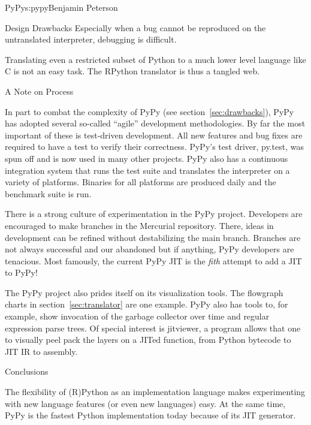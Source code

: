 \begin{aosachapter}{PyPy}{s:pypy}{Benjamin Peterson}
\begin{aosasect1}{Design Drawbacks}
Especially when a bug cannot be reproduced on the untranslated interpreter,
debugging is difficult.

Translating even a restricted subset of Python to a much lower level language
like C is not an easy task. The RPython translator is thus a tangled web.

\end{aosasect1}

\begin{aosasect1}{A Note on Process}

In part to combat the complexity of PyPy (see section~\ref{sec:drawbacks}), PyPy
has adopted several so-called ``agile'' development methodologies. By far the
most important of these is test-driven development. All new features and bug
fixes are required to have a test to verify their correctness. PyPy's test
driver, py.test, was spun off and is now used in many other projects. PyPy also
has a continuous integration system that runs the test suite and translates the
interpreter on a variety of platforms. Binaries for all platforms are produced
daily and the benchmark suite is run.

There is a strong culture of experimentation in the PyPy project. Developers are
encouraged to make branches in the Mercurial repository. There, ideas in
development can be refined without destabilizing the main branch. Branches are
not always successful and our abandoned but if anything, PyPy developers are
tenacious. Most famously, the current PyPy JIT is the \emph{fith} attempt to add
a JIT to PyPy!

The PyPy project also prides itself on its visualization tools. The flowgraph
charts in section~\ref{sec:translator} are one example. PyPy also has tools to,
for example, show invocation of the garbage collector over time and regular
expression parse trees. Of special interest is jitviewer, a program allows that
one to visually peel pack the layers on a JITed function, from Python bytecode
to JIT IR to assembly.

\end{aosasect1}

\begin{aosasect1}{Conclusions}

The flexibility of (R)Python as an implementation language makes experimenting
with new language features (or even new languages) easy. At the same time, PyPy
is the fastest Python implementation today because of its JIT generator.

\end{aosasect1}

\end{aosachapter}
